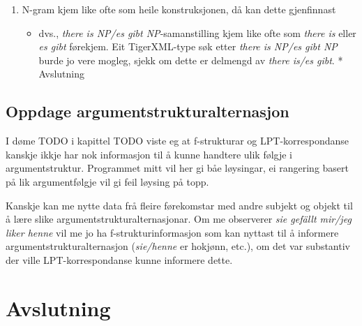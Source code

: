 \documentclass[11pt,a4paper,oneside,draft]{book}
\begin{document}
\begin{enumerate}
\item N-gram kjem like ofte som heile konstruksjonen, då kan dette
   gjenfinnast

\begin{itemize}
\item dvs., \emph{there is NP/es gibt NP}-samanstilling kjem like ofte som
     \emph{there is} eller \emph{es gibt} førekjem. Eit TigerXML-type søk etter
     \emph{there is NP/es gibt NP} burde jo vere mogleg, sjekk om dette er
     delmengd av \emph{there is/es gibt}. * Avslutning
\end{itemize}

\end{enumerate}



\section{Oppdage argumentstrukturalternasjon}
\label{sec-5.2}

 I døme TODO i kapittel TODO viste eg at f-strukturar og
LPT-korrespondanse kanskje ikkje har nok informasjon til å kunne
handtere ulik følgje i argumentstruktur. Programmet mitt vil her gi
båe løysingar, ei rangering basert på lik argumentfølgje vil gi feil
løysing på topp.

Kanskje kan me nytte data frå fleire førekomstar med andre subjekt og
objekt til å lære slike argumentstrukturalternasjonar.  Om me
observerer \emph{sie gefällt mir/jeg liker henne} vil me jo ha
f-strukturinformasjon som kan nyttast til å informere
argumentstrukturalternasjon (\emph{sie/henne} er hokjønn, etc.), om det var
substantiv der ville LPT-korrespondanse kunne informere dette.


\chapter{Avslutning}
\label{sec-6}
\end{document}
